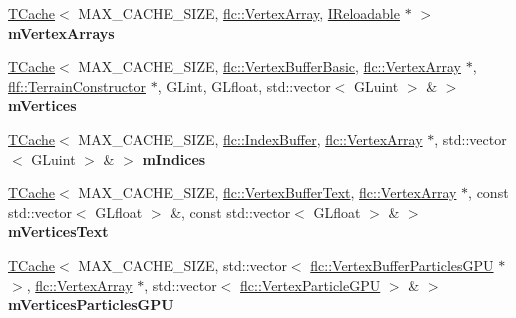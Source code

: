 \begin{DoxyCompactItemize}
\item 
\mbox{\label{structflw_1_1flf_1_1BufferSystem_a7974ca27bdeeb1606fb34d54a9f828fa}} 
\hyperlink{structflw_1_1flf_1_1TCache}{T\+Cache}$<$ M\+A\+X\+\_\+\+C\+A\+C\+H\+E\+\_\+\+S\+I\+ZE, \hyperlink{classflw_1_1flc_1_1VertexArray}{flc\+::\+Vertex\+Array}, \hyperlink{classflw_1_1flf_1_1IReloadable}{I\+Reloadable} $\ast$ $>$ {\bfseries m\+Vertex\+Arrays}
\item 
\mbox{\label{structflw_1_1flf_1_1BufferSystem_ada93731ae4c7155525f3d4961e329a54}} 
\hyperlink{structflw_1_1flf_1_1TCache}{T\+Cache}$<$ M\+A\+X\+\_\+\+C\+A\+C\+H\+E\+\_\+\+S\+I\+ZE, \hyperlink{classflw_1_1flc_1_1VertexBufferBasic}{flc\+::\+Vertex\+Buffer\+Basic}, \hyperlink{classflw_1_1flc_1_1VertexArray}{flc\+::\+Vertex\+Array} $\ast$, \hyperlink{classflw_1_1flf_1_1TerrainConstructor}{flf\+::\+Terrain\+Constructor} $\ast$, G\+Lint, G\+Lfloat, std\+::vector$<$ G\+Luint $>$ \& $>$ {\bfseries m\+Vertices}
\item 
\mbox{\label{structflw_1_1flf_1_1BufferSystem_a0e8fe9e2c159bedf179376db8406a12d}} 
\hyperlink{structflw_1_1flf_1_1TCache}{T\+Cache}$<$ M\+A\+X\+\_\+\+C\+A\+C\+H\+E\+\_\+\+S\+I\+ZE, \hyperlink{classflw_1_1flc_1_1IndexBuffer}{flc\+::\+Index\+Buffer}, \hyperlink{classflw_1_1flc_1_1VertexArray}{flc\+::\+Vertex\+Array} $\ast$, std\+::vector$<$ G\+Luint $>$ \& $>$ {\bfseries m\+Indices}
\item 
\mbox{\label{structflw_1_1flf_1_1BufferSystem_a9f8c063d64ae750b96f9fb2f64fed774}} 
\hyperlink{structflw_1_1flf_1_1TCache}{T\+Cache}$<$ M\+A\+X\+\_\+\+C\+A\+C\+H\+E\+\_\+\+S\+I\+ZE, \hyperlink{classflw_1_1flc_1_1VertexBufferText}{flc\+::\+Vertex\+Buffer\+Text}, \hyperlink{classflw_1_1flc_1_1VertexArray}{flc\+::\+Vertex\+Array} $\ast$, const std\+::vector$<$ G\+Lfloat $>$ \&, const std\+::vector$<$ G\+Lfloat $>$ \& $>$ {\bfseries m\+Vertices\+Text}
\item 
\mbox{\label{structflw_1_1flf_1_1BufferSystem_afd8dce391dc910999a16c4fdd53a79e3}} 
\hyperlink{structflw_1_1flf_1_1TCache}{T\+Cache}$<$ M\+A\+X\+\_\+\+C\+A\+C\+H\+E\+\_\+\+S\+I\+ZE, std\+::vector$<$ \hyperlink{classflw_1_1flc_1_1VertexBufferParticlesGPU}{flc\+::\+Vertex\+Buffer\+Particles\+G\+PU} $\ast$ $>$, \hyperlink{classflw_1_1flc_1_1VertexArray}{flc\+::\+Vertex\+Array} $\ast$, std\+::vector$<$ \hyperlink{structflw_1_1flc_1_1VertexParticleGPU}{flc\+::\+Vertex\+Particle\+G\+PU} $>$ \& $>$ {\bfseries m\+Vertices\+Particles\+G\+PU}

\end{DoxyCompactItemize}
